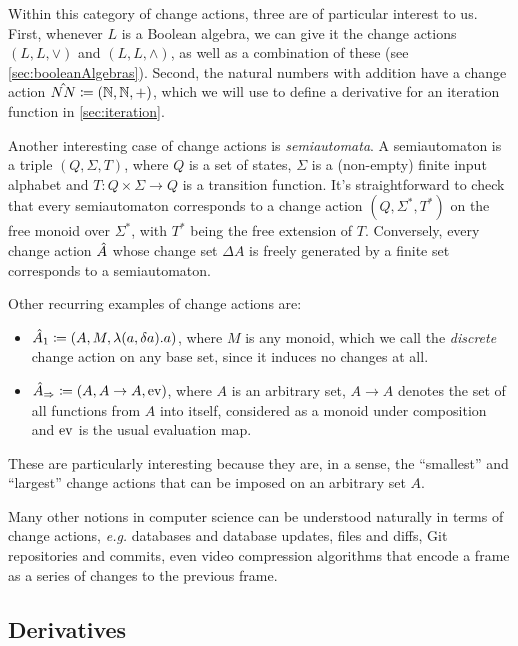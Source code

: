 Within this category of change actions, three are of particular interest to us. First, whenever
$L$ is a Boolean algebra, we can give it the change actions $(L, L, \vee)$ and $(L, L, \wedge)$, 
as well as a combination of these (see \cref{sec:booleanAlgebras}). Second,
the natural numbers with addition have a change action $\hat{NN} \coloneqq (\mathbb{N}, \mathbb{N}, +)$, which we will
use to define a derivative for an iteration function in \cref{sec:iteration}.

Another interesting case of change actions is \textit{semiautomata}. A semiautomaton is a triple
$(Q, \Sigma, T)$, where $Q$ is a set of states, $\Sigma$ is a (non-empty) finite input alphabet
and $T : Q \times \Sigma \rightarrow Q$ is a transition function. It's straightforward to check
that every semiautomaton corresponds to a change action $(Q, \Sigma^*, T^*)$ on the free monoid
over $\Sigma^*$, with $T^*$ being the free extension of $T$. Conversely, every change action $\hat{A}$
whose change set $\Delta A$ is freely generated by a finite set corresponds to a semiautomaton.

Other recurring examples of change actions are:
\begin{itemize}
  \item $\hat{A}_1 \coloneqq (A,M,\lambda(a, \delta a). a)$, where $M$ is any monoid,
    which we call the \emph{discrete} change action on any base set, since it
    induces no changes at all.
  \item $\hat{A}_\Rightarrow \coloneqq (A,A \rightarrow A,\operatorname{ev})$, where $A$ is an arbitrary
    set, $A \rightarrow A$ denotes the set of all functions from $A$ into itself, considered as
    a monoid under composition and $\operatorname{ev}$ is the usual evaluation map.
\end{itemize}
These are particularly interesting because they are, in a sense, the ``smallest'' and ``largest''
change actions that can be imposed on an arbitrary set $A$.

Many other notions in computer science can be understood naturally in terms of change actions,
\emph{e.g.} databases and database updates, files and diffs, Git repositories and commits, even 
video compression algorithms that encode a frame as a series of changes to the previous frame.

\subsection{Derivatives}

